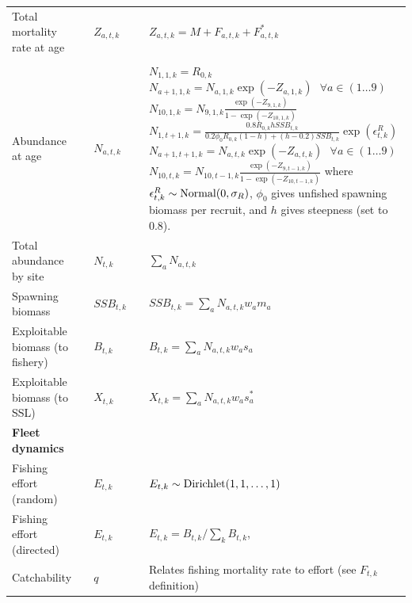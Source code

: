 \documentclass[nonumbib,leqno]{nrc1}
\begin{document}
\begin{longtable}{p{4cm}lll p{8cm}}
Total mortality rate at age & & $Z_{a,t,k}$ & & $Z_{a,t,k}=M+F_{a,t,k}+F_{a,t,k}^*$ \\[2pt]
\\

Abundance at age & & $N_{a,t,k}$ & & $N_{1,1,k} = R_{0,k}$ \newline
$N_{a+1,1,k}=N_{a,1,k}\exp(-Z_{a,1,k})~~~\forall a \in (1\ldots 9)$ \newline
$N_{10,1,k}=N_{9,1,k} \frac{\exp( -Z_{9,1,k})} {1-\exp (-Z_{10,1,k})}$ \newline
$N_{1,t+1,k}=\frac{0.8 R_{0,k} h SSB_{t,k}} {0.2\phi_0 R_{0,k} (1-h)+(h-0.2)SSB_{t,k}}
  \exp(\epsilon_{t,k}^R)$ \newline
$N_{a+1,t+1,k}=N_{a,t,k}\exp(-Z_{a,t,k})~~~\forall a \in (1\ldots 9)$ \newline
$N_{10,t,k}=N_{10,t-1,k} \frac{\exp( -Z_{9,t-1,k})}{1-\exp (-Z_{10,t-1,k})}$ \newline
where $\epsilon_{t,k}^R \sim {\rm Normal}(0,\sigma_R)$, $\phi_0$ gives unfished spawning biomass per recruit, and $h$ gives steepness (set to 0.8).  \\[2pt]

Total abundance by site & & $N_{t,k}$ & & $ \sum_a N_{a,t,k}$ \\

Spawning biomass & & $SSB_{t,k}$ & & $SSB_{t,k}=\sum_a N_{a,t,k} w_a m_a$ \\

Exploitable biomass (to fishery) & & $B_{t,k}$ & & $B_{t,k}= \sum_a N_{a,t,k} w_a s_a$\\

Exploitable biomass (to SSL) & &  $X_{t,k}$ & & $X_{t,k}= \sum_a N_{a,t,k} w_a s_a^*$\\

\midrule

\multicolumn{1}{l}{\textbf{Fleet dynamics}}\\

Fishing effort (random) & & $E_{t,k} $ & & $ E_{t,k} \sim {\rm Dirichlet}(1,1,\hdots,1)$ \\[2pt]

Fishing effort (directed) & & $E_{t,k}$ & & $ E_{t,k} = B_{t,k}/\sum_{k} B_{t,k} $, \newline \\[2pt]

Catchability & & $q$ & & Relates fishing mortality rate to effort (see $F_{t,k}$ definition) \\


\end{longtable}
\end{document}
